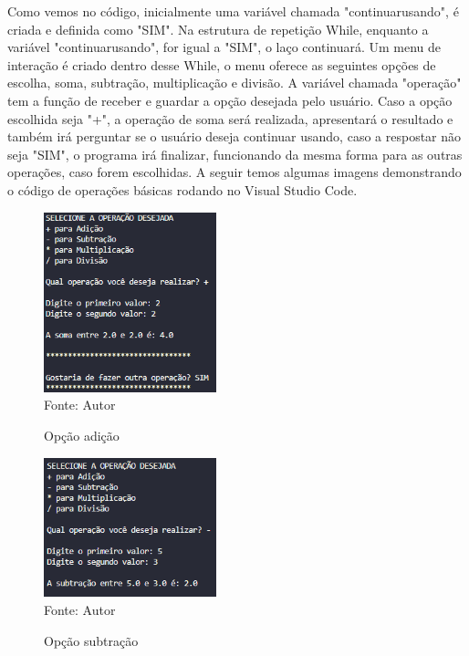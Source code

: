 	Como vemos no código, inicialmente uma variável chamada "continuar\textunderscore usando", é criada e definida como "SIM". Na estrutura de repetição While, enquanto a variável "continuar\textunderscore usando", for igual a "SIM", o laço continuará. Um menu de interação é criado dentro desse While, o menu oferece as seguintes opções de escolha, soma, subtração, multiplicação e divisão. A variável chamada "operação" tem a função de receber e guardar a opção desejada pelo usuário. Caso a opção escolhida seja "+", a operação de soma será realizada, apresentará o resultado e também irá perguntar se o usuário deseja continuar usando, caso a respostar não seja "SIM", o programa irá finalizar, funcionando da mesma forma para as outras operações, caso forem escolhidas. A seguir temos algumas imagens demonstrando o código de operações básicas rodando no Visual Studio Code.

	\begin{figure}[H]
		\begin{center}
			\caption{Opção adição} \label{ling1}
			\includegraphics[width=5cm]{soma.PNG} \\
			{\tiny \sf Fonte:{ Autor}}
		\end{center}
	\end{figure}

	\begin{figure}[H]
		\begin{center}
			\caption{Opção subtração} \label{ling1}
			\includegraphics[width=5cm]{subtracao.PNG} \\
			{\tiny \sf Fonte:{ Autor}}
		\end{center}
	\end{figure}

